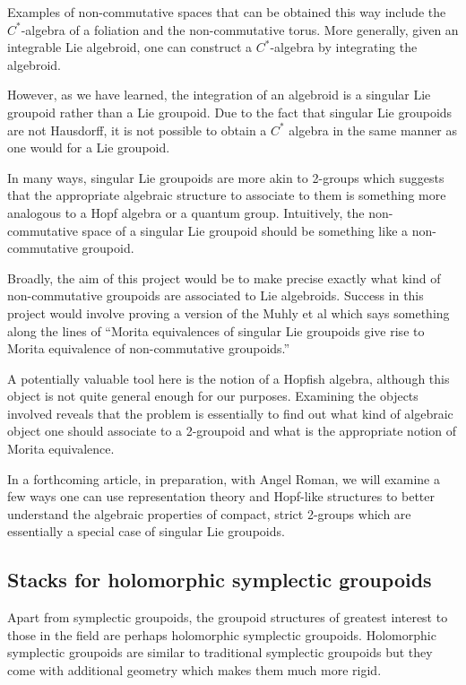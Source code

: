 \documentclass[11pt, letterpaper]{article}
\begin{document}
Examples of non-commutative spaces that can be obtained this way include the \( C^*\)-algebra of a foliation and the non-commutative torus. More generally, given an integrable Lie algebroid, one can construct a \( C^*\)-algebra by integrating the algebroid.

However, as we have learned, the integration of an algebroid is a singular Lie groupoid rather than a Lie groupoid. Due to the fact that singular Lie groupoids are not Hausdorff, it is not possible to obtain a \( C^*\) algebra in the same manner as one would for a Lie groupoid.

In many ways, singular Lie groupoids are more akin to 2-groups which suggests that the appropriate algebraic structure to associate to them is something more analogous to a Hopf algebra or a quantum group. Intuitively, the non-commutative space of a singular Lie groupoid should be something like a non-commutative groupoid. 

Broadly, the aim of this project would be to make precise exactly what kind of non-commutative groupoids are associated to Lie algebroids. Success in this project would involve proving a version of the Muhly et al\cite{AlgebraMorita} which says something along the lines of ``Morita equivalences of singular Lie groupoids give rise to Morita equivalence of non-commutative groupoids.''

A potentially valuable tool here is the notion of a Hopfish algebra\cite{Hopfish}, although this object is not quite general enough for our purposes. Examining the objects involved reveals that the problem is essentially to find out what kind of algebraic object one should associate to a 2-groupoid and what is the appropriate notion of Morita equivalence. 

In a forthcoming article, in preparation, with Angel Roman, we will examine a few ways one can use representation theory and Hopf-like structures to better understand the algebraic properties of compact, strict 2-groups which are essentially a special case of singular Lie groupoids\cite{doublegrpds}.

\subsection{Stacks for holomorphic symplectic groupoids}\label{proj:holomorphic}
Apart from symplectic groupoids, the groupoid structures of greatest interest to those in the field are perhaps holomorphic symplectic groupoids. Holomorphic symplectic groupoids are similar to traditional symplectic groupoids but they come with additional geometry which makes them much more rigid.
\end{document}
